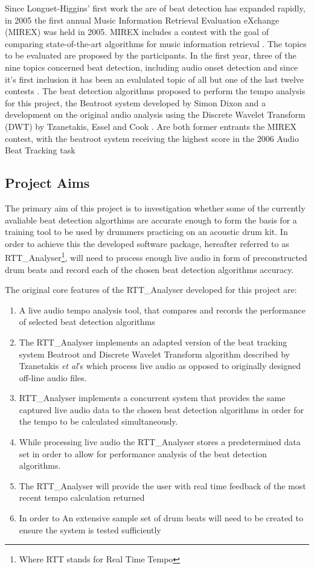 \documentclass[a4paper, 11pt]{article}
\begin{document}
Since Longuet-Higgins' first work the are of beat detection has expanded rapidly, in 2005 the first annual Music Information Retrieval Evaluation eXchange (MIREX) was held in 2005. MIREX includes a contest with the goal of comparing state-of-the-art algorithms for music information retrieval \cite{mirex-main}. The topics to be evaluated are proposed by the participants. In the first year, three of the nine topics concerned beat detection, including audio onset detection and since it's first inclusion it has been an evalulated topic of all but one of the last twelve contests \cite{mirex-onset}. The beat detection algorithms proposed to perform the tempo analysis for this project, the Beatroot system developed by Simon Dixon \cite{dixon1} and a development on the original audio analysis using the Discrete Wavelet Transform (DWT) by Tzanetakis, Essel and Cook \cite{tzane1}. Are both former entrants the MIREX contest, with the beatroot system receiving the highest score in the 2006 Audio Beat Tracking task \cite{mirex-06} 

\subsection{Project Aims}
The primary aim of this project is to investigation whether some of the currently avaliable beat detection algorthims are accurate enough to form the basis for a training tool to be used by drummers practicing on an acoustic drum kit. In order to achieve this the developed software package, hereafter referred to as  RTT\_Analyser\footnote{Where RTT stands for Real Time Tempo}, will need to process enough live audio in form of preconstructed drum beats and record each of the chosen beat detection algorithms accuracy. 

The original core features of the RTT\_Analyser developed for this project are:

\begin{enumerate}
\item A live audio tempo analysis tool, that compares and records the performance of selected beat detection algorithms
\item The RTT\_Analyser implements an adapted version of the beat tracking system Beatroot and Discrete Wavelet Transform algorithm described by Tzanetakis \textit{et al}'s\cite{tzane1} which process live audio as opposed to originally designed off-line audio files.
\item RTT\_Analyser implements a concurrent system that provides the same captured live audio data to the chosen beat detection algorithms in order for the tempo to be calculated simultaneously.
\item While processing live audio the RTT\_Analyser stores a predetermined data set in order to allow for performance analysis of the beat detection algorithms.
\item The RTT\_Analyser will provide the user with real time feedback of the most recent tempo calculation returned
\item In order to An extensive sample set of drum beats will need to be created to ensure the system is tested sufficiently
\end{enumerate}
\end{document}
